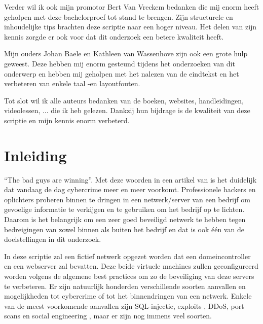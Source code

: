 \documentclass[pdftex,a4paper,12pt]{report}
\begin{document}
Verder wil ik ook mijn promotor Bert Van Vreckem bedanken die mij enorm heeft geholpen met deze bachelorproef tot stand te brengen. Zijn structurele en inhoudelijke tips brachten deze scriptie naar een hoger niveau. Het delen van zijn kennis zorgde er ook voor dat dit onderzoek een betere kwaliteit heeft. \newline

Mijn ouders Johan Baele en Kathleen van Wassenhove zijn ook een grote hulp geweest. Deze hebben mij enorm gesteund tijdens het onderzoeken van dit onderwerp en hebben mij geholpen met het nalezen van de eindtekst en het verbeteren van enkele taal -en layoutfouten. \newline

Tot slot wil ik alle auteurs bedanken van de boeken, websites, handleidingen, videolessen, ... die ik heb gelezen. Dankzij hun bijdrage is de kwaliteit van deze scriptie en mijn kennis enorm verbeterd. 


\tableofcontents



\chapter{Inleiding}
\label{ch:inleiding}
"`The bad guys are winning"'. Met deze woorden in een artikel van \cite{Wiener-Bronner2014} is het duidelijk dat vandaag de dag cybercrime meer en meer voorkomt. Professionele hackers en oplichters proberen binnen te dringen in een netwerk/server van een bedrijf om gevoelige informatie te verkijgen en te gebruiken om het bedrijf op te lichten. Daarom is het belangrijk om een zeer goed beveiligd netwerk te hebben tegen bedreigingen van zowel binnen als buiten het bedrijf en dat is ook één van de doelstellingen in dit onderzoek. \newline

In deze scriptie zal een fictief netwerk opgezet worden dat een domeincontroller en een webserver zal bevatten. Deze beide virtuele machines zullen geconfigureerd worden volgens de algemene best practices om zo de beveiliging van deze servers te verbeteren. Er zijn natuurlijk honderden verschillende soorten aanvallen en mogelijkheden tot cybercrime of tot het binnendringen van een netwerk. Enkele van de meest voorkomende aanvallen zijn SQL-injectie, exploits \citep{Siddharth2006}, DDoS, port scans en social engineering \citep{Gibson2011}, maar er zijn nog immens veel soorten.
\end{document}

